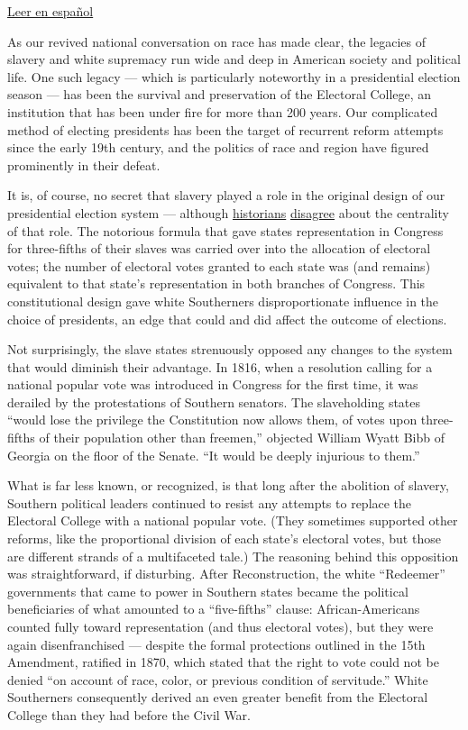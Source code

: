 \href{https://www.nytimes.com/es/2020/08/03/espanol/opinion/colegio-electoral-estados-unidos.html}{Leer
en español}

As our revived national conversation on race has made clear, the
legacies of slavery and white supremacy run wide and deep in American
society and political life. One such legacy --- which is particularly
noteworthy in a presidential election season --- has been the survival
and preservation of the Electoral College, an institution that has been
under fire for more than 200 years. Our complicated method of electing
presidents has been the target of recurrent reform attempts since the
early 19th century, and the politics of race and region have figured
prominently in their defeat.

It is, of course, no secret that slavery played a role in the original
design of our presidential election system --- although
\href{https://www.nytimes.com/2019/04/04/opinion/the-electoral-college-slavery-myth.html?action=click\&module=RelatedLinks\&pgtype=Article}{historians}
\href{https://www.nytimes.com/2019/04/06/opinion/electoral-college-slavery.html}{disagree}
about the centrality of that role. The notorious formula that gave
states representation in Congress for three-fifths of their slaves was
carried over into the allocation of electoral votes; the number of
electoral votes granted to each state was (and remains) equivalent to
that state's representation in both branches of Congress. This
constitutional design gave white Southerners disproportionate influence
in the choice of presidents, an edge that could and did affect the
outcome of elections.

Not surprisingly, the slave states strenuously opposed any changes to
the system that would diminish their advantage. In 1816, when a
resolution calling for a national popular vote was introduced in
Congress for the first time, it was derailed by the protestations of
Southern senators. The slaveholding states ``would lose the privilege
the Constitution now allows them, of votes upon three-fifths of their
population other than freemen,'' objected William Wyatt Bibb of Georgia
on the floor of the Senate. ``It would be deeply injurious to them.''

What is far less known, or recognized, is that long after the abolition
of slavery, Southern political leaders continued to resist any attempts
to replace the Electoral College with a national popular vote. (They
sometimes supported other reforms, like the proportional division of
each state's electoral votes, but those are different strands of a
multifaceted tale.) The reasoning behind this opposition was
straightforward, if disturbing. After Reconstruction, the white
``Redeemer'' governments that came to power in Southern states became
the political beneficiaries of what amounted to a ``five-fifths''
clause: African-Americans counted fully toward representation (and thus
electoral votes), but they were again disenfranchised --- despite the
formal protections outlined in the 15th Amendment, ratified in 1870,
which stated that the right to vote could not be denied ``on account of
race, color, or previous condition of servitude.'' White Southerners
consequently derived an even greater benefit from the Electoral College
than they had before the Civil War.

